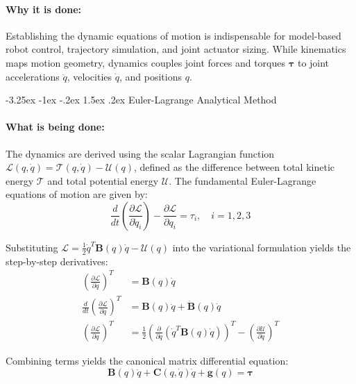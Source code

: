 \documentclass[11pt, a4paper]{article}
\makeatletter
\renewcommand{\subsection}{\@startsection{subsection}{2}{\z@}%
    {-3.25ex \@plus -1ex \@minus -.2ex}%
    {1.5ex \@plus .2ex}%
    {\normalfont\large\bfseries\color{brandaccent}}}
\makeatother
\begin{document}
\paragraph{Why it is done:}
Establishing the dynamic equations of motion is indispensable for model-based robot control, trajectory simulation, and joint actuator sizing. While kinematics maps motion geometry, dynamics couples joint forces and torques $\boldsymbol{\tau}$ to joint accelerations $\ddot{q}$, velocities $\dot{q}$, and positions $q$.

\subsection{Euler-Lagrange Analytical Method}
\paragraph{What is being done:}
The dynamics are derived using the scalar Lagrangian function \\$\mathcal{L}(q, \dot{q}) = \mathcal{T}(q, \dot{q}) - \mathcal{U}(q)$, defined as the difference between total kinetic energy $\mathcal{T}$ and total potential energy $\mathcal{U}$. The fundamental Euler-Lagrange equations of motion are given by:
\begin{equation}
    \frac{d}{dt}\left(\frac{\partial \mathcal{L}}{\partial \dot{q}_i}\right) - \frac{\partial \mathcal{L}}{\partial q_i} = \tau_i, \quad i = 1, 2, 3
\end{equation}

Substituting $\mathcal{L} = \frac{1}{2}\dot{q}^T \mathbf{B}(q)\dot{q} - \mathcal{U}(q)$ into the variational formulation yields the step-by-step derivatives:
\begin{align}
    \left(\frac{\partial \mathcal{L}}{\partial \dot{q}}\right)^T &= \mathbf{B}(q)\dot{q} \\
    \frac{d}{dt}\left(\frac{\partial \mathcal{L}}{\partial \dot{q}}\right)^T &= \mathbf{B}(q)\ddot{q} + \mathbf{\dot{B}}(q)\dot{q} \\
    \left(\frac{\partial \mathcal{L}}{\partial q}\right)^T &= \frac{1}{2}\left(\frac{\partial}{\partial q}\left(\dot{q}^T \mathbf{B}(q)\dot{q}\right)\right)^T - \left(\frac{\partial \mathcal{U}}{\partial q}\right)^T
\end{align}

Combining terms yields the canonical matrix differential equation:
\begin{equation}
    \mathbf{B}(q)\ddot{q} + \mathbf{C}(q, \dot{q})\dot{q} + \mathbf{g}(q) = \boldsymbol{\tau}
\end{equation}
\end{document}
